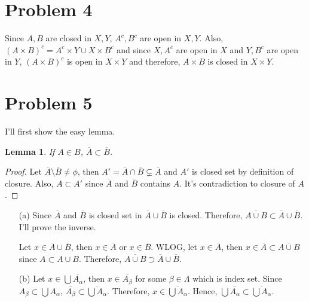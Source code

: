 \documentclass{article}
\newtheorem{lemma}{Lemma}
\begin{document}
\section*{Problem 4}
Since $A,B$ are closed in $X,Y$, $A^c,B^c$ are open in $X,Y$. Also, $(A\times B)^c=A^c\times Y \cup X \times B^c $ and since $X,A^c$ are open in $X$ and $Y,B^c$ are open in $Y$, $(A\times B)^c$ is open in $X\times Y$ and therefore, $A\times B$ is closed in $X\times Y$. 

\section*{Problem 5}
I'll first show the easy lemma.
\begin{lemma}
If $A\in B$, $\overline{A}\subset\overline{B}$.
\end{lemma}
\begin{proof}
Let $\overline{A}\setminus\overline{B}\neq\phi$, then $A'=\overline{A}\cap \overline{B}	\varsubsetneq \overline{A}$ and $A'$ is closed set by definition of closure. Also, $A\subset A'$ since $\overline{A}$ and $\overline{B}$ contains $A$. It's contradiction to closure of $A$.
\end{proof}
\begin{enumerate}
\item[(a)]
Since $\overline{A}$ and $\overline{B}$ is closed set in $\overline{A}\cup \overline{B}$ is closed. Therefore, $\overline{A\cup B}\subset \overline{A}\cup \overline{B}$. I'll prove the inverse.

Let $x\in\overline{A}\cup \overline{B}$, then $x\in \overline{A}$ or $x\in\overline{B}$. WLOG, let $x\in \overline{A}$, then $x\in\overline{A}\subset\overline{A\cup B}$ since $A\subset A\cup B$. Therefore, $\overline{A\cup B}\supset \overline{A}\cup \overline{B}$.
\item[(b)] Let $x\in \bigcup \overline{A_\alpha}$, then $x\in \overline{A_\beta}$ for some $\beta\in \Lambda$ which is index set. Since $A_\beta\subset \bigcup A_\alpha$, $\overline{A_\beta}\subset \overline{\bigcup A_\alpha}$. Therefore, $x\in \overline{\bigcup A_\alpha}$. Hence, $\bigcup \overline{A_\alpha}\subset\overline{\bigcup A_\alpha}$.
\end{enumerate}
\end{document}
